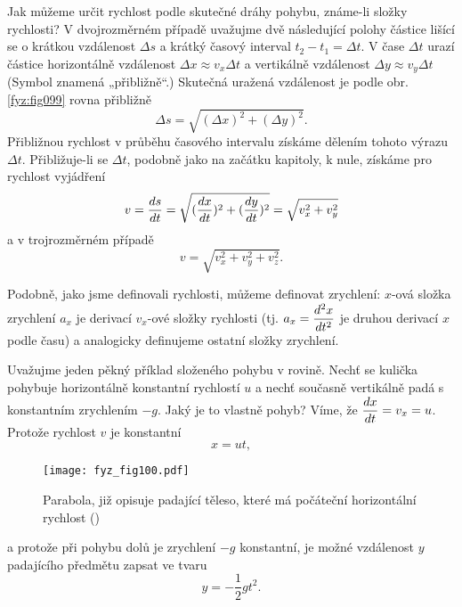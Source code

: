     Jak můžeme určit rychlost podle skutečné dráhy pohybu, známe-li složky rychlosti? V 
    dvojrozměrném případě uvažujme dvě následující polohy částice lišící se o krátkou vzdálenost 
    \(\Delta s\) a krátký časový interval \(t_2- t_1 = \Delta t\). V čase \(\Delta t\) urazí 
    částice horizontálně vzdálenost \(\Delta x \approx  v_x\Delta t\) a vertikálně vzdálenost 
    \(\Delta y \approx  v_y\Delta t\) (Symbol \uv{\(\approx\)} znamená „přibližně“.) Skutečná 
    uražená vzdálenost je podle obr. \ref{fyz:fig099} rovna přibližně
    \begin{equation}\label{FYZ:eq109}
      \Delta s = \sqrt{(\Delta x)^2 + (\Delta y)^2}.
    \end{equation}
    Přibližnou rychlost v průběhu časového intervalu získáme dělením tohoto výrazu \(\Delta t\). 
    Přibližuje-li se \(\Delta t\), podobně jako na začátku kapitoly, k nule, získáme pro rychlost 
    vyjádření
    \begin{equation}\label{FYZ:eq110}
      v = \dfrac{d s}{d t} = \sqrt{(\dfrac{d x}{d t})^2 + (\dfrac{d y}{d t})^2} = \sqrt{v_x^2 + v_y^2}
    \end{equation}
    a v trojrozměrném případě
    \begin{equation}\label{FYZ:eq097}
      v = \sqrt{v_x^2 + v_y^2 + v_z^2}.
    \end{equation}

    Podobně, jako jsme definovali rychlosti, můžeme definovat zrychlení: \(x\)-ová složka zrychlení 
    \(a_x\) je derivací \(v_x\)-ové složky rychlosti (tj. \(a_x = \dfrac{d^2 x}{d t^2}\) je druhou derivací 
    \(x\) podle času) a analogicky definujeme ostatní složky zrychlení.

    Uvažujme jeden pěkný příklad složeného pohybu v rovině. Nechť se kulička pohybuje horizontálně 
    konstantní rychlostí \(u\) a nechť současně vertikálně padá s konstantním zrychlením \(-g\). 
    Jaký je to vlastně pohyb? Víme, že \(\dfrac{d x}{d t} = v_x = u\). Protože rychlost \(v\) je 
    konstantní
    \begin{equation}\label{FYZ:eq100}
      x = ut,
    \end{equation}

    \begin{wrapfigure}[12]{r}{5cm}  %
      \centering
      \texttt{[image: fyz\_fig100.pdf]}
      \caption{Parabola, již opisuje padající těleso, které má počáteční horizontální rychlost
               (\cite[s.~119]{Feynman01})}
      \label{fyz:fig100}
    \end{wrapfigure}
    a protože při pohybu dolů je zrychlení \(-g\) konstantní, je možné vzdálenost \(y\) padajícího 
    předmětu zapsat ve tvaru
    \begin{equation}\label{FYZ:eq098}
      y = -\frac{1}{2}gt^2.
    \end{equation}
    
